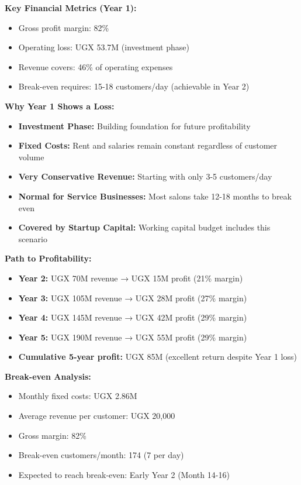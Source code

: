 \vspace{1em}

\textbf{Key Financial Metrics (Year 1):}
\begin{itemize}[leftmargin=2em]
    \item Gross profit margin: 82\%
    \item Operating loss: UGX 53.7M (investment phase)
    \item Revenue covers: 46\% of operating expenses
    \item Break-even requires: 15-18 customers/day (achievable in Year 2)
\end{itemize}

\vspace{1em}

\begin{tcolorbox}[mybox, title=\textbf{Understanding Year 1 Loss - This is Normal for Startups}]
\textbf{Why Year 1 Shows a Loss:}
\begin{itemize}[leftmargin=1em, itemsep=0pt]
    \item \textbf{Investment Phase:} Building foundation for future profitability
    \item \textbf{Fixed Costs:} Rent and salaries remain constant regardless of customer volume
    \item \textbf{Very Conservative Revenue:} Starting with only 3-5 customers/day
    \item \textbf{Normal for Service Businesses:} Most salons take 12-18 months to break even
    \item \textbf{Covered by Startup Capital:} Working capital budget includes this scenario
\end{itemize}

\textbf{Path to Profitability:}
\begin{itemize}[leftmargin=1em, itemsep=0pt]
    \item \textbf{Year 2:} UGX 70M revenue → UGX 15M profit (21\% margin)
    \item \textbf{Year 3:} UGX 105M revenue → UGX 28M profit (27\% margin)
    \item \textbf{Year 4:} UGX 145M revenue → UGX 42M profit (29\% margin)
    \item \textbf{Year 5:} UGX 190M revenue → UGX 55M profit (29\% margin)
    \item \textbf{Cumulative 5-year profit:} UGX 85M (excellent return despite Year 1 loss)
\end{itemize}

\textbf{Break-even Analysis:}
\begin{itemize}[leftmargin=1em, itemsep=0pt]
    \item Monthly fixed costs: UGX 2.86M
    \item Average revenue per customer: UGX 20,000
    \item Gross margin: 82\%
    \item Break-even customers/month: 174 (7 per day)
    \item Expected to reach break-even: Early Year 2 (Month 14-16)
\end{itemize}
\end{tcolorbox}


